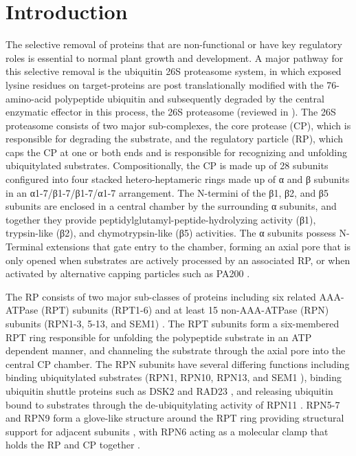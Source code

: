 \section{Introduction}
	The selective removal of proteins that are non-functional or have key regulatory roles is essential to normal plant growth and development. A major pathway for this selective removal is the ubiquitin 26S proteasome system, in which exposed lysine residues on target-proteins are post translationally modified with the 76-amino-acid polypeptide ubiquitin and subsequently degraded by the central enzymatic effector in this process, the 26S proteasome (reviewed in \citep{finley09, livneh16, vierstra09}). The 26S proteasome consists of two major sub-complexes, the core protease (CP), which is responsible for degrading the substrate, and the regulatory particle (RP), which caps the CP at one or both ends and is responsible for recognizing and unfolding ubiquitylated substrates. Compositionally, the CP is made up of 28 subunits configured into four stacked hetero-heptameric rings made up of α and β subunits in an α1-7/β1-7/β1-7/α1-7 arrangement. The N-termini of the β1, β2, and β5 subunits are enclosed in a central chamber by the surrounding α subunits, and together they provide peptidylglutamyl-peptide-hydrolyzing activity (β1), trypsin-like (β2), and chymotrypsin-like (β5) activities. The α subunits possess N-Terminal extensions that gate entry to the chamber, forming an axial pore that is only opened when substrates are actively processed by an associated RP, or when activated by alternative capping particles such as PA200 \citep{dange11, sadre-bazzaz10}. 

	The RP consists of two major sub-classes of proteins including six related AAA-ATPase (RPT) subunits (RPT1-6) and at least 15 non-AAA-ATPase (RPN) subunits (RPN1-3, 5-13, and SEM1) \citep{finley09, paraskevopoulos14, russell13}. The RPT subunits form a six-membered RPT ring responsible for unfolding the polypeptide substrate in an ATP dependent manner, and channeling the substrate through the axial pore into the central CP chamber. The RPN subunits have several differing functions including binding ubiquitylated substrates (RPN1, RPN10, RPN13, and SEM1 \citep{elsasser04, paraskevopoulos14, schreiner08}), binding ubiquitin shuttle proteins such as DSK2 and RAD23 \citep{elsasser02, farmer10, fatimababy10, lin11}, and releasing ubiquitin bound to substrates through the de-ubiquitylating activity of RPN11 \citep{verma02, yao02}.  RPN5-7 and RPN9 form a glove-like structure around the RPT ring providing structural support for adjacent subunits \citep{lander12, lasker12, unverdorben14}, with RPN6 acting as a molecular clamp that holds the RP and CP together \citep{pathare12}.


